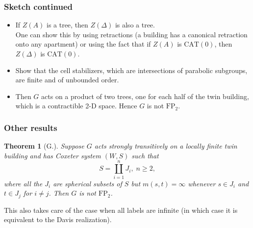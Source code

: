 \documentclass[xcolor=dvipsnames]{beamer}
\newcommand{\CAT}{\mathrm{CAT}}
\newcommand{\FP}{\mathrm{FP}}
\newtheorem{Theo}{Theorem}
\theoremstyle{definition}
\begin{document}


\begin{frame}
\frametitle{Sketch continued}
\begin{itemize}
\item If $Z(A)$ is a tree, then $Z(\Delta)$ is also a tree.\\
\smallskip
One can show this by using retractions (a building has a canonical retraction onto any apartment) or using the fact that if $Z(A)$ is $\CAT(0)$, then $Z(\Delta)$ is $\CAT(0)$.
\item Show that the cell stabilizers, which are intersections of parabolic subgroups, are finite and of unbounded order. 
\item Then $G$ acts on a product of two trees, one for each half of the twin building, which is a contractible 2-D space. Hence $G$ is not $\FP_2$. 
\end{itemize}
\end{frame}

\begin{frame}
\frametitle{Other results}
\begin{Theo}[G.]
Suppose $G$ acts strongly transitively on a locally finite twin building and has Coxeter system $(W,S)$ such that
$$
S = \coprod_{i=1}^n J_i, \; n\geq 2,
$$
where all the $J_i$ are spherical subsets of $S$ but $m(s,t) = \infty$ whenever $s\in J_i$ and $t\in J_j$ for $i\neq j$. Then $G$ is not $\FP_2$.
\end{Theo}

This also takes care of the case when all labels are infinite (in which case it is equivalent to the Davis realization). 
\end{frame}
\end{document}
